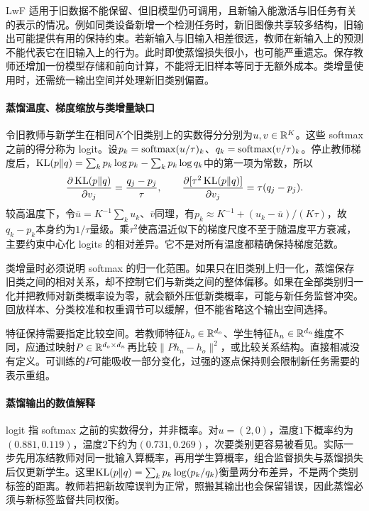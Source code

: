 LwF 适用于旧数据不能保留、但旧模型仍可调用，且新输入能激活与旧任务有关的表示的情况。例如同类设备新增一个检测任务时，新旧图像共享较多结构，旧输出可能提供有用的保持约束。若新输入与旧输入相差很远，教师在新输入上的预测不能代表它在旧输入上的行为。此时即使蒸馏损失很小，也可能严重遗忘。保存教师还增加一份模型存储和前向计算，不能将无旧样本等同于无额外成本。类增量使用时，还需统一输出空间并处理新旧类别偏置。

\paragraph{蒸馏温度、梯度缩放与类增量缺口}
令旧教师与新学生在相同$K$个旧类别上的实数得分分别为$u,v\in\mathbb{R}^K$。这些 softmax 之前的得分称为 logit。设$p_k=\operatorname{softmax}(u/\tau)_k$、$q_k=\operatorname{softmax}(v/\tau)_k$。停止教师梯度后，$\operatorname{KL}(p\|q)=\sum_kp_k\log p_k-\sum_kp_k\log q_k$中的第一项为常数，所以
\begin{equation}
 \frac{\partial\operatorname{KL}(p\|q)}{\partial v_j}=\frac{q_j-p_j}{\tau},\qquad
 \frac{\partial[\tau^2\operatorname{KL}(p\|q)]}{\partial v_j}=\tau(q_j-p_j).
\end{equation}
较高温度下，令$\bar u=K^{-1}\sum_ku_k$、$\bar v$同理，有$p_k\approx K^{-1}+(u_k-\bar u)/(K\tau)$，故$q_k-p_k$本身约为$1/\tau$量级。乘$\tau^2$使高温近似下的梯度尺度不至于随温度平方衰减，主要约束中心化 logits 的相对差异。它不是对所有温度都精确保持梯度范数。

类增量时必须说明 softmax 的归一化范围。如果只在旧类别上归一化，蒸馏保存旧类之间的相对关系，却不控制它们与新类之间的整体偏移。如果在全部类别归一化并把教师对新类概率设为零，就会额外压低新类概率，可能与新任务监督冲突。回放样本、分类校准和权重调节可以缓解，但不能省略这个输出空间选择。

特征保持需要指定比较空间。若教师特征$h_o\in\mathbb{R}^{d_o}$、学生特征$h_n\in\mathbb{R}^{d_n}$维度不同，应通过映射$P\in\mathbb{R}^{d_o\times d_n}$再比较$\|Ph_n-h_o\|^2$，或比较关系结构。直接相减没有定义。可训练的$P$可能吸收一部分变化，过强的逐点保持则会限制新任务需要的表示重组。

\paragraph{蒸馏输出的数值解释}
logit 指 softmax 之前的实数得分，并非概率。对$u=(2,0)$，温度$1$下概率约为$(0.881,0.119)$，温度$2$下约为$(0.731,0.269)$，次要类别更容易被看见。实际一步先用冻结教师对同一批输入算概率，再用学生算概率，组合监督损失与蒸馏损失后仅更新学生。这里$\operatorname{KL}(p\|q)=\sum_kp_k\log(p_k/q_k)$衡量两分布差异，不是两个类别标签的距离。教师若把新故障误判为正常，照搬其输出也会保留错误，因此蒸馏必须与新标签监督共同权衡。

